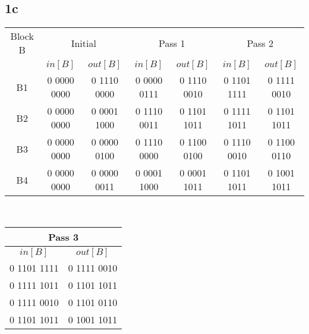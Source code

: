 \documentclass[10pt,a4paper]{article}
\begin{document}
\subsection*{1c}
\begin{tabular}{|c|c|c|c|c|c|c|}
\hline 
Block B   & \multicolumn{2}{|c|}{Initial}   & \multicolumn{2}{|c|}{Pass 1}     & \multicolumn{2}{|c|}{Pass 2}     \\  
\cline{2-7}
          & $in[B]$        & $out[B]$       & $in[B]$        & $out[B]$        & $in[B]$        & $out[B]$        \\ 
\hline                                                                                                      
B1        & 0 0000 0000    & 0 1110 0000    & 0 0000 0111    &  0 1110 0010    & 0 1101 1111    &  0 1111 0010    \\ 
B2        & 0 0000 0000    & 0 0001 1000    & 0 1110 0011    &  0 1101 1011    & 0 1111 1011    &  0 1101 1011    \\ 
B3        & 0 0000 0000    & 0 0000 0100    & 0 1110 0000    &  0 1100 0100    & 0 1110 0010    &  0 1100 0110    \\ 
B4        & 0 0000 0000    & 0 0000 0011    & 0 0001 1000    &  0 0001 1011    & 0 1101 1011    &  0 1001 1011    \\ 
\hline 
\end{tabular} 
\\
\begin{tabular}{|c|c|}
\hline 
\multicolumn{2}{|c|}{Pass 3}     \\  
\hline
$in[B]$        & $out[B]$        \\ 
\hline            
0 1101 1111    &  0 1111 0010    \\ 
0 1111 1011    &  0 1101 1011    \\ 
0 1111 0010    &  0 1101 0110    \\ 
0 1101 1011    &  0 1001 1011    \\ 
\hline 
\end{tabular} 
\end{document}
